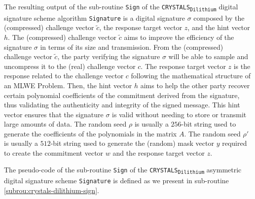 \documentclass[runningheads]{llncs}
\numberwithin{equation}{section}
\begin{document}
    \noindent The resulting output of the sub-routine \texttt{Sign} of the \texorpdfstring{\texttt{CRYSTALS}\textsubscript{\texttt{Dilithium}}}\/ digital signature scheme algorithm \texttt{Signature} is a digital signature $\sigma$ composed by the (compressed) challenge vector $\tilde{c}$, the response target vector $z$, and the hint vector $h$. The (compressed) challenge vector $\tilde{c}$ aims to improve the efficiency of the signature $\sigma$ in terms of its size and transmission. From the (compressed) challenge vector $\tilde{c}$, the party verifying the signature $\sigma$ will be able to sample and uncompress it to the (real) challenge vector $c$. The response target vector $z$ is the response related to the challenge vector $c$ following the mathematical structure of an MLWE Problem. Then, the hint vector $h$ aims to help the other party recover certain polynomial coefficients of the commitment derived from the signature, thus validating the authenticity and integrity of the signed message. This hint vector ensures that the signature $\sigma$ is valid without needing to store or transmit large amounts of data. The random seed $\rho$ is usually a $256$-bit string used to generate the coefficients of the polynomials in the matrix $A$. The random seed $\rho'$ is usually a $512$-bit string used to generate the (random) mask vector $y$ required to create the commitment vector $w$ and the response target vector $z$.

    \vspace{1ex}

    \noindent The pseudo-code of the sub-routine \texttt{Sign} of the \texorpdfstring{\texttt{CRYSTALS}\textsubscript{\texttt{Dilithium}}}\/ asymmetric digital signature scheme \texttt{Signature} is defined as we present in sub-routine \ref{subrou:crystals-dilithium-sign}.
    
    \clearpage
\end{document}
